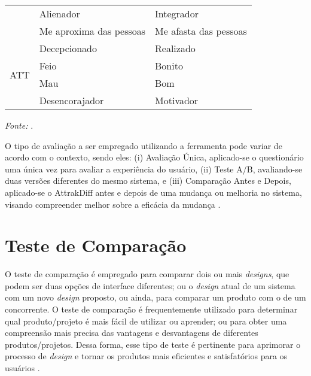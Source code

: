 \begin{table}[h]
\begin{tabular}{c|ll}
                         & \multicolumn{1}{l|}{Alienador}               & Integrador            \\ \cline{2-3} 
                         & \multicolumn{1}{l|}{Me aproxima das pessoas} & Me afasta das pessoas \\ \hline
    \multirow{4}{*}{ATT} & \multicolumn{1}{l|}{Decepcionado}            & Realizado             \\ \cline{2-3} 
                         & \multicolumn{1}{l|}{Feio}                    & Bonito                \\ \cline{2-3} 
                         & \multicolumn{1}{l|}{Mau}                     & Bom                   \\ \cline{2-3} 
                         & \multicolumn{1}{l|}{Desencorajador}          & Motivador             \\ \hline
    \end{tabular}
    \begin{tablenotes}[flushleft]
      \centering
      \item \textit{Fonte:} \cite{hassenzahl2003}.
    \end{tablenotes}
\end{table}

O tipo de avaliação a ser empregado utilizando a ferramenta pode variar de acordo com o contexto, sendo eles: (i) Avaliação Única, aplicado-se o questionário uma única vez para avaliar 
a experiência do usuário, (ii) Teste A/B, avaliando-se duas versões diferentes do mesmo sistema, e (iii) Comparação Antes e Depois, aplicado-se o AttrakDiff antes e 
depois de uma mudança ou melhoria no sistema,  visando compreender melhor sobre a eficácia da mudança \cite{nzongo2018}.

\section{Teste de Comparação}
\label{sec:Teste de Comparação}

O teste de comparação é empregado para comparar dois ou mais \textit{designs}, que podem ser duas opções de interface diferentes; ou o \textit{design} atual de um sistema com um novo 
\textit{design} proposto, ou ainda, para comparar um produto com o de um concorrente. O teste de comparação é frequentemente utilizado para determinar qual produto/projeto é mais fácil 
de utilizar ou aprender; ou para obter uma compreensão mais precisa das vantagens e desvantagens de diferentes produtos/projetos. Dessa forma, esse tipo de teste é pertinente para aprimorar 
o processo de \textit{design} e tornar os produtos mais eficientes e satisfatórios para os usuários \cite{rubin2011}.

